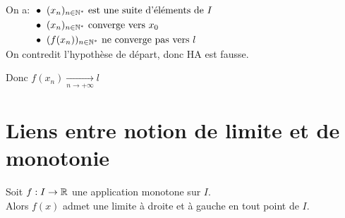 \documentclass[12pt,twoside,a4paper]{article}
\begin{document}
\begin{preuve}
\begin{liste}
\begin{tab}
					On a: $\begin{aligned}[t]
					&\bullet\ (x_n)_{n\in\mathbb{N}^{*}} \text{ est une suite d'\'el\'ements de }I\\
					&\bullet\ (x_n)_{n\in\mathbb{N}^{*}} \text{ converge vers }x_0\\
					&\bullet\ (f(x_n))_{n\in\mathbb{N}^{*}} \text{ ne converge pas vers }l
					\end{aligned}$\\
					On contredit l'hypoth\`ese de d\'epart, donc HA est fausse.
				\end{tab}
				Donc $f\left( x_n\right) \mathop{\longrightarrow}\limits_{n\rightarrow +\infty}l$
			\end{liste}
		\end{preuve}
	\section{Liens entre notion de limite et de monotonie}
		\begin{prop}
			Soit $f:I\rightarrow \mathbb{R}$ une application monotone sur $I$.\\
			Alors $f(x)$ admet une limite \`a droite et \`a gauche en tout point de $I$.
		\end{prop}
\end{document}
